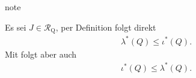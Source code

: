 \documentclass[letterpaper,10pt,english]{jupyterBook}
\begin{document}
\begin{sphinxadmonition}{note}
\sphinxAtStartPar
{}

\sphinxAtStartPar
Es sei \(J\in\mathcal{R}_{\text{Q}}\), per Definition folgt direkt
\begin{equation*}
\begin{split}\lambda^\ast(Q)\leq \iota^\ast(Q).\end{split}
\end{equation*}
\sphinxAtStartPar
Mit {\hyperref[\detokenize{masstheorie/masstheorie:thm:lebesgue}]{}} folgt aber auch
\begin{equation*}
\begin{split}\iota^\ast(Q)\leq \lambda^\ast(Q).\end{split}
\end{equation*}
\sphinxAtStartPar
{}


\end{sphinxadmonition}
\end{document}
